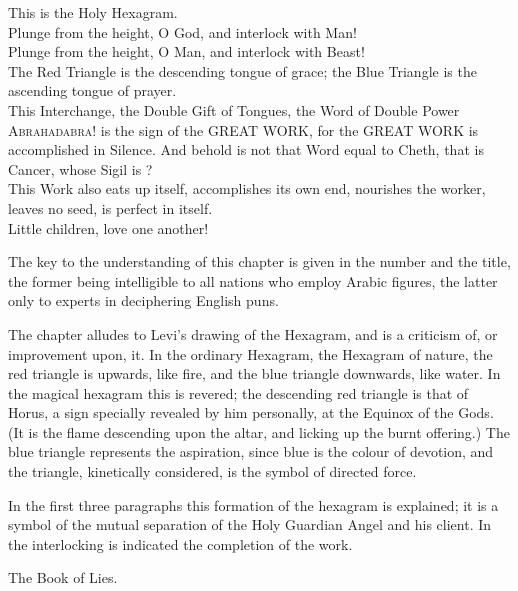   \label{holyhexagram}
  \begin{Verse}
  This is the Holy Hexagram. \\
  Plunge from the height, O God, and interlock with Man! \\
  Plunge from the height, O Man, and interlock with Beast! \\
  The Red Triangle is the descending tongue of grace; the Blue Triangle is the ascending tongue of prayer. \\
  This Interchange, the Double Gift of Tongues, the Word of Double Power \textemdash{} \textsc{Abrahadabra!} \textemdash{} is the sign of the GREAT WORK, for the GREAT WORK is accomplished in Silence. And behold is not that Word equal to Cheth, that is Cancer, whose Sigil is \cancer{}? \\
  This Work also eats up itself, accomplishes its own end, nourishes the worker, leaves no seed, is perfect in itself. \\
  Little children, love one another! \\
  \end{Verse}
  \pagebreak

  \addchap*{}
  \addsec*{}

  The key to the understanding of this chapter is given in the number and the title, the former being intelligible to all nations who employ Arabic figures, the latter only to experts in deciphering English puns.

  The chapter alludes to Levi's drawing of the Hexagram, and is a criticism of, or improvement upon, it. In the ordinary Hexagram, the Hexagram of nature, the red triangle is upwards, like fire, and the blue triangle downwards, like water.  In the magical hexagram this is revered; the descending red triangle is that of Horus, a sign specially revealed by him personally, at the Equinox of the Gods.  (It is the flame descending upon the altar, and licking up the burnt offering.)  The blue triangle represents the aspiration, since blue is the colour of devotion, and the triangle, kinetically considered, is the symbol of directed force.

  In the first three paragraphs this formation of the hexagram is explained; it is a symbol of the mutual separation of the Holy Guardian Angel and his client. In the interlocking is indicated the completion of the work.

  \textemdash{} The Book of Lies.

  \vspace*{\fill}
